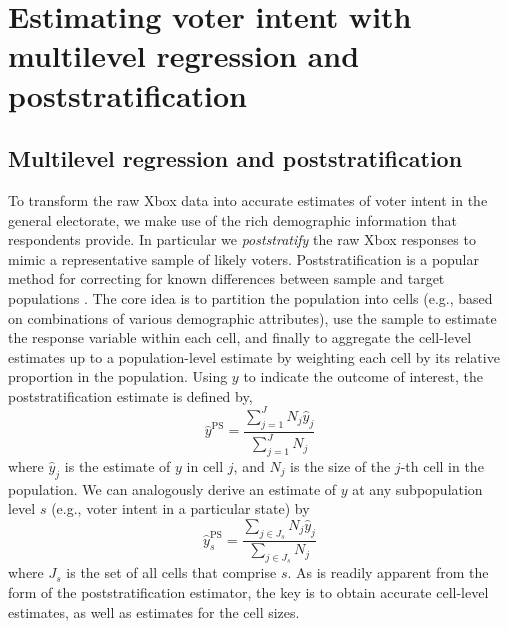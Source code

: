 \documentclass[preprint,authoryear,12pt]{elsarticle}
\begin{document}


\section{Estimating voter intent with multilevel regression and poststratification}
\label{sec:mrp}
\subsection{Multilevel regression and poststratification}
To transform the raw Xbox data into accurate estimates of voter intent in the general electorate, we
make use of the rich demographic information that respondents provide.
In particular we \emph{poststratify} the raw Xbox responses to mimic a representative sample of likely voters.
Poststratification is a popular method for correcting for known differences
between sample and target populations \citep{little1993post}.
The core idea is to partition the population into cells (e.g., based on combinations of various demographic attributes), use the sample to estimate the response variable within each
cell, and finally to aggregate the cell-level estimates up to a population-level estimate by weighting each cell by its relative proportion in the population.
Using $y$ to indicate the outcome of interest, the poststratification estimate is defined by,
\[\hat{y}^{\text{PS}}=\frac{\sum_{j=1}^JN_j\hat{y}_j}{\sum_{j=1}^JN_j}\]
where $\hat{y}_j$ is the estimate of $y$ in cell $j$, and $N_j$ is the size of the $j$-th cell in the population.
We can analogously
derive an estimate of $y$ at any subpopulation level $s$ (e.g., voter intent in a particular state)
by
\[\hat{y}_s^{\text{PS}}=\frac{\sum_{j\in J_s}N_j\hat{y}_j}{\sum_{j\in J_s}N_j}\]
where $J_s$ is the set of all cells that comprise $s$. As is readily apparent from the form of the poststratification estimator, the key is to obtain accurate cell-level estimates,
as well as estimates for the cell sizes.
\end{document}
